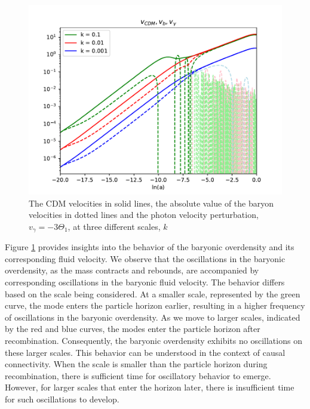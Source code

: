 \documentclass{aa}
\begin{document}
\begin{figure}[h!]
   \includegraphics[scale=0.5]{Figures/milestone_3/Vs.pdf}
   \caption{The CDM velocities in solid lines, the absolute value of the baryon velocities
   in dotted lines and the photon velocity perturbation, $v_\gamma=-3\Theta_1$, at three different scales, $k$}
   \label{fig:M3_Vs}
\end{figure}
Figure \ref{fig:M3_Vs} provides insights into the behavior of the baryonic overdensity and its corresponding fluid velocity. We observe that the oscillations in the baryonic overdensity, as the mass contracts and rebounds, are accompanied by corresponding oscillations in the baryonic fluid velocity. The behavior differs based on the scale being considered. At a smaller scale, represented by the green curve, the mode enters the particle horizon earlier, resulting in a higher frequency of oscillations in the baryonic overdensity. As we move to larger scales, indicated by the red and blue curves, the modes enter the particle horizon after recombination. Consequently, the baryonic overdensity exhibits no oscillations on these larger scales. This behavior can be understood in the context of causal connectivity. When the scale is smaller than the particle horizon during recombination, there is sufficient time for oscillatory behavior to emerge. However, for larger scales that enter the horizon later, there is insufficient time for such oscillations to develop.
\end{document}
